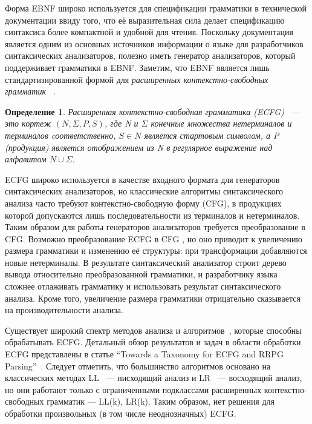 \documentclass[14pt]{matmex-diploma-custom}
\newtheorem{mydef}{Определение}
\begin{document}
	Форма EBNF широко используется для спецификации грамматики в технической документации
	ввиду того, что её выразительная сила делает спецификацию синтаксиса более компактной
	и удобной для чтения. Поскольку документация является одним из основных источников информации
	о языке для разработчиков синтаксических анализаторов, полезно иметь генератор
	анализаторов, который поддерживает грамматики в EBNF. Заметим, что EBNF является 
	лишь стандартизированной формой для \textit{расширенных контекстно-свободных грамматик}
	~\cite{ECFG}.
	
	\begin{mydef}
		Расширенная контекстно-свободная грамматика (ECFG)~\cite{ECFG} --- это кортеж $(N, \Sigma, P, S)$,
		где N и $\Sigma$ конечные множества нетерминалов и терминалов cоответственно, 
		$S\in N$ является стартовым символом, а P (продукция) является отображением из N в
		регулярное выражение над алфавитом $N \cup \Sigma$.
		
	\end{mydef}
	ECFG широко используется в качестве входного формата для генераторов синтаксических анализаторов, 
	но классические алгоритмы синтаксического анализа часто требуют контекстно-свободную форму (CFG),
	в продукциях которой допускаются лишь последовательности из терминалов и нетерминалов. Таким образом 
	для работы генераторов анализаторов требуется преобразование в CFG.
	Возможно преобразование ECFG в CFG \cite{ELL}, но оно приводит к увеличению
	размера грамматики и изменению её структуры: при трансформации добавляются новые
	нетерминалы. В результате синтаксический анализатор строит дерево вывода относительно
	преобразованной грамматики, и разработчику языка сложнее отлаживать грамматику 
	и использовать результат синтаксического анализа. Кроме того, увеличение размера грамматики 
    отрицательно сказывается на производительности анализа.
    
	Существует широкий спектр методов анализа и алгоритмов~\cite{AttributedELL,ELRR,
		ECFGparsing,ELLParser,ELL,ECFG,ELALR,ELRParsing}, которые способны обрабатывать 
	ECFG. Детальный обзор результатов и задач в области обработки ECFG 
	представлены в статье ``Towards a Taxonomy for ECFG and RRPG Parsing''~\cite{ECFG}.
	Следует отметить, что большинство алгоритмов основано на классических методах
	LL~\cite{ELLParser,AttributedELL,PredictiveECFG} --- нисходящий анализ и LR~\cite{ELRParsing,ELALR,ELRR}
    --- восходящий анализ,
	но они работают только с ограниченными подклассами расширенных контекстно-свободных грамматик ---
    LL(k), LR(k). Таким образом, нет решения 
	для обработки произвольных (в том числе неоднозначных) ECFG.
	
\end{document}
